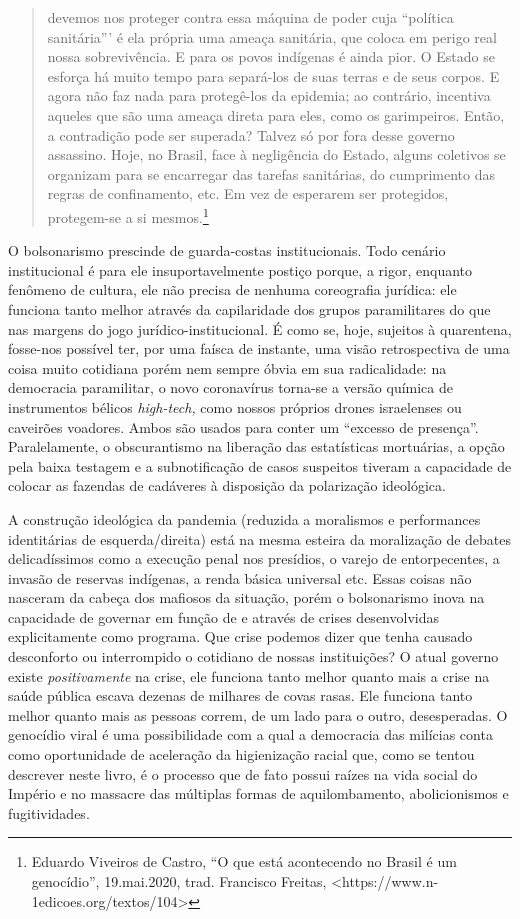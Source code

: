 \begin{quote}
devemos nos proteger contra essa máquina de poder cuja ``política
sanitária''' é ela própria uma ameaça sanitária, que coloca em perigo
real nossa sobrevivência. E para os povos indígenas é ainda pior. O
Estado se esforça há muito tempo para separá-los de suas terras e de
seus corpos. E agora não faz nada para protegê-los da epidemia; ao
contrário, incentiva aqueles que são uma ameaça direta para eles, como
os garimpeiros. Então, a contradição pode ser superada? Talvez só por
fora desse governo assassino. Hoje, no Brasil, face à negligência do
Estado, alguns coletivos se organizam para se encarregar das tarefas
sanitárias, do cumprimento das regras de confinamento, etc. Em vez de
esperarem ser protegidos, protegem-se a si mesmos.\footnote{Eduardo
  Viveiros de Castro, ``O que está acontecendo no Brasil é um
  genocídio'', 19.mai.2020, trad. Francisco Freitas,
  \textless{}https://www.n-1edicoes.org/textos/104\textgreater{}}
\end{quote}

O bolsonarismo prescinde de guarda-costas institucionais. Todo cenário
institucional é para ele insuportavelmente postiço porque, a rigor,
enquanto fenômeno de cultura, ele não precisa de nenhuma coreografia
jurídica: ele funciona tanto melhor através da capilaridade dos grupos
paramilitares do que nas margens do jogo jurídico-institucional. É como
se, hoje, sujeitos à quarentena, fosse-nos possível ter, por uma faísca
de instante, uma visão retrospectiva de uma coisa muito cotidiana porém
nem sempre óbvia em sua radicalidade: na democracia paramilitar, o novo
coronavírus torna-se a versão química de instrumentos bélicos
\emph{high-tech,} como nossos próprios drones israelenses ou caveirões
voadores. Ambos são usados para conter um ``excesso de presença''.
Paralelamente, o obscurantismo na liberação das estatísticas mortuárias,
a opção pela baixa testagem e a subnotificação de casos suspeitos
tiveram a capacidade de colocar as fazendas de cadáveres à disposição da
polarização ideológica.~

A construção ideológica da pandemia (reduzida a moralismos e
performances identitárias de esquerda/direita) está na mesma esteira da
moralização de debates delicadíssimos como a execução penal nos
presídios, o varejo de entorpecentes, a invasão de reservas indígenas, a
renda básica universal etc. Essas coisas não nasceram da cabeça dos
mafiosos da situação, porém o bolsonarismo inova na capacidade de
governar em função de e através de crises desenvolvidas explicitamente
como programa. Que crise podemos dizer que tenha causado desconforto ou
interrompido o cotidiano de nossas instituições? O atual governo existe
\emph{positivamente} na crise, ele funciona tanto melhor quanto mais a
crise na saúde pública escava dezenas de milhares de covas rasas. Ele
funciona tanto melhor quanto mais as pessoas correm, de um lado para o
outro, desesperadas. O genocídio viral é uma possibilidade com a qual a
democracia das milícias conta como oportunidade de aceleração da
higienização racial que, como se tentou descrever neste livro, é o
processo que de fato possui raízes na vida social do Império e no
massacre das múltiplas formas de aquilombamento, abolicionismos e
fugitividades.~

